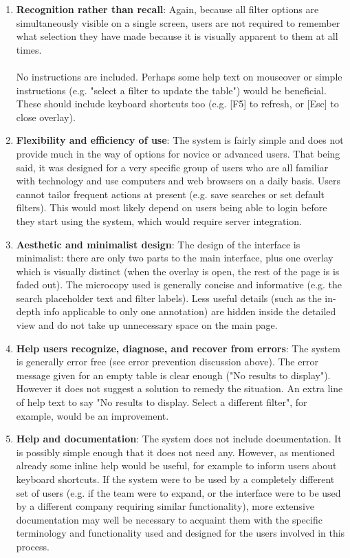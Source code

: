 \begin{enumerate}
\item \textbf{Recognition rather than recall}: Again, because all filter options are simultaneously visible on a single screen, users are not required to remember what selection they have made because it is visually apparent to them at all times. \\
\\
No instructions are included. Perhaps some help text on mouseover or simple instructions (e.g. "select a filter to update the table") would be beneficial. These should include keyboard shortcuts too (e.g. [F5] to refresh, or [Esc] to close overlay).

\item \textbf{Flexibility and efficiency of use}: The system is fairly simple and does not provide much in the way of options for novice or advanced users. That being said, it was designed for a very specific group of users who are all familiar with technology and use computers and web browsers on a daily basis.  Users cannot tailor frequent actions at present (e.g. save searches or set default filters). This would most likely depend on users being able to login before they start using the system, which would require server integration. 

\item \textbf{Aesthetic and minimalist design}: The design of the interface is minimalist: there are only two parts to the main interface, plus one overlay which is visually distinct (when the overlay is open, the rest of the page is is faded out). The microcopy used is generally concise and informative (e.g. the search placeholder text and filter labels). Less useful details (such as the in-depth info applicable to only one annotation) are hidden inside the detailed view and do not take up unnecessary space on the main page.  

\item \textbf{Help users recognize, diagnose, and recover from errors}: The system is generally error free (see error prevention discussion above). The error message given for an empty table is clear enough ("No results to display"). However it does not suggest a solution to remedy the situation. An extra line of help text to say "No results to display. Select a different filter", for example, would be an improvement. 

\item \textbf{Help and documentation}: The system does not include documentation. It is possibly simple enough that it does not need any. However, as mentioned already some inline help would be useful, for example to inform users about keyboard shortcuts. If the system were to be used by a completely different set of users (e.g. if the team were to expand, or the interface were to be used by a different company requiring similar functionality), more extensive documentation may well be necessary to acquaint them with the specific terminology and functionality used and designed for the users involved in this process.  
\end{enumerate}

